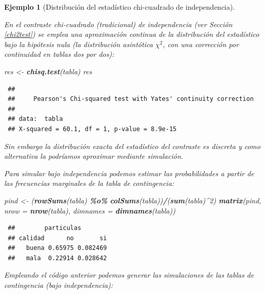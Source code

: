 \documentclass[
  spanish,
  10pt,
]{book}
\newenvironment{Shaded}{\begin{snugshade}}{\end{snugshade}}
\newcommand{\AttributeTok}[1]{\textcolor[rgb]{0.13,0.29,0.53}{#1}}
\newcommand{\DecValTok}[1]{\textcolor[rgb]{0.00,0.00,0.81}{#1}}
\newcommand{\FunctionTok}[1]{\textcolor[rgb]{0.13,0.29,0.53}{\textbf{#1}}}
\newcommand{\NormalTok}[1]{#1}
\newcommand{\OtherTok}[1]{\textcolor[rgb]{0.56,0.35,0.01}{#1}}
\newcommand{\SpecialCharTok}[1]{\textcolor[rgb]{0.81,0.36,0.00}{\textbf{#1}}}
\theoremstyle{break}
\newtheorem{example}{Ejemplo}[chapter]
\theoremstyle{nonumberplain}
\begin{document}
\begin{example}[Distribución del estadístico chi-cuadrado de independencia]
\protect\hypertarget{exm:chicuadind}{}\label{exm:chicuadind}

En el contraste chi-cuadrado (tradicional) de independencia (ver Sección \ref{chi2test}) se emplea una aproximación continua de la distribución del estadístico bajo la hipótesis nula (la distribución asintótica \(\chi^2\), con una corrección por continuidad en tablas dos por dos):

\begin{Shaded}
\begin{Highlighting}[]
\NormalTok{res }\OtherTok{\textless{}{-}} \FunctionTok{chisq.test}\NormalTok{(tabla)}
\NormalTok{res}
\end{Highlighting}
\end{Shaded}

\begin{verbatim}
 ## 
 ##     Pearson's Chi-squared test with Yates' continuity correction
 ## 
 ## data:  tabla
 ## X-squared = 60.1, df = 1, p-value = 8.9e-15
\end{verbatim}

Sin embargo la distribución exacta del estadístico del contraste es discreta y como alternativa la podríamos aproximar mediante simulación.

Para simular bajo independencia podemos estimar las probabilidades a partir de las frecuencias marginales de la tabla de contingencia:

\begin{Shaded}
\begin{Highlighting}[]
\NormalTok{pind }\OtherTok{\textless{}{-}}\NormalTok{ (}\FunctionTok{rowSums}\NormalTok{(tabla) }\SpecialCharTok{\%o\%} \FunctionTok{colSums}\NormalTok{(tabla))}\SpecialCharTok{/}\NormalTok{(}\FunctionTok{sum}\NormalTok{(tabla)}\SpecialCharTok{\^{}}\DecValTok{2}\NormalTok{)}
\FunctionTok{matrix}\NormalTok{(pind, }\AttributeTok{nrow =} \FunctionTok{nrow}\NormalTok{(tabla), }\AttributeTok{dimnames =} \FunctionTok{dimnames}\NormalTok{(tabla))}
\end{Highlighting}
\end{Shaded}

\begin{verbatim}
 ##        particulas
 ## calidad      no       si
 ##   buena 0.65975 0.082469
 ##   mala  0.22914 0.028642
\end{verbatim}

Empleando el código anterior podemos generar las simulaciones de las tablas de contingencia (bajo independencia):


\end{example}
\end{document}
